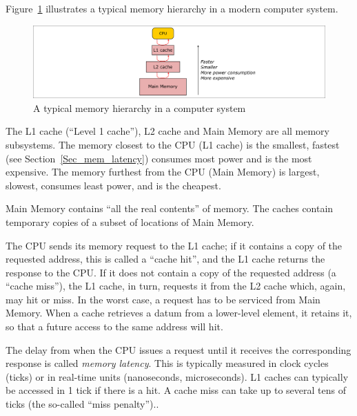 Figure~\ref{Fig_Mem_Hierarchy} illustrates a typical memory hierarchy
in a modern computer system.
\begin{figure}[htbp]
  \centerline{\includegraphics[width=6in,angle=0]{Figures/Fig_Mem_Hierarchy}}
  \caption{\label{Fig_Mem_Hierarchy}
           A typical memory hierarchy in a computer system}
\end{figure}
The L1 cache (``Level 1 cache''), L2 cache and Main Memory are all
memory subsystems.  The memory closest to the CPU (L1 cache) is the
smallest, fastest (see Section~\ref{Sec_mem_latency}) consumes most
power and is the most expensive.  The memory furthest from the CPU
(Main Memory) is largest, slowest, consumes least power, and is the
cheapest.

Main Memory contains ``all the real contents'' of memory.  The caches
contain temporary copies of a subset of locations of Main Memory.


The CPU sends its memory request to the L1 cache; if it contains a
copy of the requested address, this is called a ``cache hit'', and the
L1 cache returns the response to the CPU.  If it does not contain a
copy of the requested address (a ``cache miss''), the L1 cache, in
turn, requests it from the L2 cache which, again, may hit or miss.  In
the worst case, a request has to be serviced from Main Memory.  When a
cache retrieves a datum from a lower-level element, it retains it, so
that a future access to the same address will hit.

\label{Sec_mem_latency}


The delay from when the CPU issues a request until it receives the
corresponding response is called \emph{memory latency}.  This is
typically measured in clock cycles (ticks) or in real-time units
(nanoseconds, microseconds).  L1 caches can typically be accessed in 1
tick if there is a hit.  A cache miss can take up to several tens of
ticks (the so-called ``miss penalty'')..

